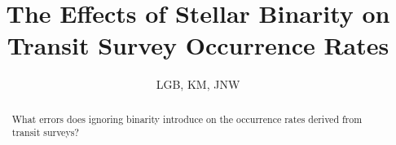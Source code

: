 \documentclass{emulateapj}
\begin{document}
%
\def\ltsima{$\; \buildrel < \over \sim \;$}
\def\lsim{\lower.5ex\hbox{\ltsima}}
\def\gtsima{$\; \buildrel > \over \sim \;$}
\def\gsim{\lower.5ex\hbox{\gtsima}}
\def\tess{{\it TESS} }
\def \teff {T_{\rm eff}}
\def \phir {\Phi_{\rm R}}
\def \fov {24$^{\circ}$}
\def \pixsz {21.1''}
\def \aeff {69.1 cm$^2$ }    
\def \epd {105 mm}                          

\def \kepler {{\it Kepler}}

%



\title{ The Effects of Stellar Binarity on Transit Survey Occurrence 
Rates }

\author{
  LGB, KM, JNW
}



\begin{abstract}

What errors does ignoring binarity introduce on the occurrence rates derived 
from transit surveys?

\end{abstract}
\end{document}
